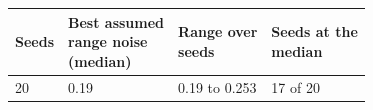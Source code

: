\begin{tabular}{llll}
\toprule
Seeds & \shortstack[l]{Best assumed\\range noise\\(median)} & \shortstack[l]{Range over\\seeds} & \shortstack[l]{Seeds at the\\median} \\
\midrule
20 & 0.19 & 0.19 to 0.253 & 17 of 20 \\
\bottomrule
\end{tabular}
